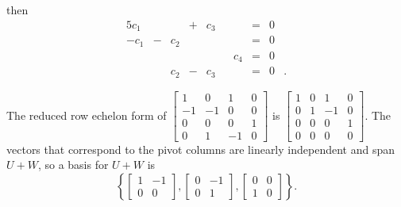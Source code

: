 \begin{example}
then 
\begin{alignat*}{5}
{}c_1 	&{} 		&{}		&{}+{}	&{}c_3	&{}	&{}		&= &0&{} \\
{-}c_1 	&{}-{} 	&{}c_2	&{}		&{}		&{}	&{}		&= &0&{} \\
{} 		&{} 		&{}		&{}		&{}		&{}	&{}c_4	&= &0&{} \\
{}		 	&{} 		&{}c_2	&{}-{}	&{}c_3	&{}	&{}		&= &0&{.} 
\end{alignat*}

The reduced row echelon form of $\left[ \begin{array}{rrrc} 1&0&1&0 \\ -1&-1&0&0 \\ 0&0&0&1 \\ 0&1&-1&0 \end{array} \right]$ is $\left[ \begin{array}{ccrc} 1&0&1&0 \\ 0&1&-1&0 \\ 0&0&0&1 \\ 0&0&0&0 \end{array} \right]$. The vectors that correspond to the pivot columns are linearly independent and span $U+W$, so a basis for $U+W$ is 
\[\left\{ \left[ \begin{array}{cr}   1 &  -1 \\ 0 & 0 \end{array} \right], \left[ \begin{array}{cr}   0 &  -1 \\ 0 & 1 \end{array} \right], \left[ \begin{array}{cc}   0 &  0 \\ 1 & 0 \end{array} \right] \right\}.\]

	\ea


\end{example}



 

